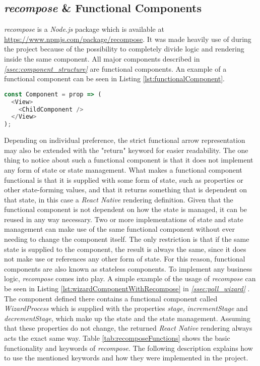 \subsection{\textit{recompose} \& Functional Components}
\label{ssec:recompose}

\textit{recompose} is a \textit{Node.js} package which is available at \url{https://www.npmjs.com/package/recompose}. It was made heavily use of during the project because of the possibility to completely divide logic and rendering inside the same component. All major components described in \textit{\ref{ssec:component_structure} } are functional components. An example of a functional component can be seen in Listing \ref{lst:functionalComponent}.

\begin{lstlisting}[language=javascript,caption=Functional Component Example,label=lst:functionalComponent]
const Component = prop => (
  <View>
    <ChildComponent />
  </View>
);
\end{lstlisting}

Depending on individual preference, the strict functional arrow representation may also be extended with the "return" keyword for easier readability. The one thing to notice about such a functional component is that it does not implement any form of state or state management. What makes a functional component functional is that it is supplied with some form of state, such as properties or other state-forming values, and that it returns something that is dependent on that state, in this case a \textit{React Native} rendering definition. Given that the functional component is not dependent on how the state is managed, it can be reused in any way necessary. Two or more implementations of state and state management can make use of the same functional component without ever needing to change the component itself. The only restriction is that if the same state is supplied to the component, the result is always the same, since it does not make use or references any other form of state. For this reason, functional components are also known as stateless components.
\newline
To implement any business logic, \textit{recompose} comes into play. A simple example of the usage of \textit{recompose} can be seen in Listing \ref{lst:wizardComponentWithRecompose} in \textit{\ref{ssec:poll_wizard} }. The component defined there contains a functional component called \textit{WizardProcess} which is supplied with the properties \textit{stage}, \textit{incrementStage} and \textit{decrementStage}, which make up the state and the state management. Assuming that these properties do not change, the returned \textit{React Native} rendering always acts the exact same way.
\newline
Table \ref{tab:recomposeFunctions} shows the basic functionality and keywords of \textit{recompose}. The following description explains how to use the mentioned keywords and how they were implemented in the project.

